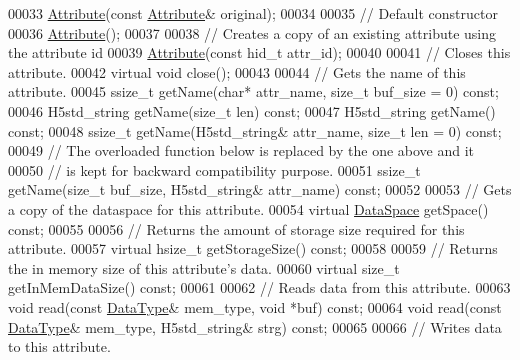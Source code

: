 \begin{DoxyCode}
00033         \hyperlink{class_h5_1_1_attribute}{Attribute}(\textcolor{keyword}{const} \hyperlink{class_h5_1_1_attribute}{Attribute}& original);
00034 
00035         \textcolor{comment}{// Default constructor}
00036         \hyperlink{class_h5_1_1_attribute}{Attribute}();
00037 
00038         \textcolor{comment}{// Creates a copy of an existing attribute using the attribute id}
00039         \hyperlink{class_h5_1_1_attribute}{Attribute}(\textcolor{keyword}{const} hid\_t attr\_id);
00040 
00041         \textcolor{comment}{// Closes this attribute.}
00042         \textcolor{keyword}{virtual} \textcolor{keywordtype}{void} close();
00043 
00044         \textcolor{comment}{// Gets the name of this attribute.}
00045         ssize\_t getName(\textcolor{keywordtype}{char}* attr\_name, \textcolor{keywordtype}{size\_t} buf\_size = 0) \textcolor{keyword}{const};
00046         H5std\_string getName(\textcolor{keywordtype}{size\_t} len) \textcolor{keyword}{const};
00047         H5std\_string getName() \textcolor{keyword}{const};
00048         ssize\_t getName(H5std\_string& attr\_name, \textcolor{keywordtype}{size\_t} len = 0) \textcolor{keyword}{const};
00049         \textcolor{comment}{// The overloaded function below is replaced by the one above and it}
00050         \textcolor{comment}{// is kept for backward compatibility purpose.}
00051         ssize\_t getName(\textcolor{keywordtype}{size\_t} buf\_size, H5std\_string& attr\_name) \textcolor{keyword}{const};
00052 
00053         \textcolor{comment}{// Gets a copy of the dataspace for this attribute.}
00054         \textcolor{keyword}{virtual} \hyperlink{class_h5_1_1_data_space}{DataSpace} getSpace() \textcolor{keyword}{const};
00055 
00056         \textcolor{comment}{// Returns the amount of storage size required for this attribute.}
00057         \textcolor{keyword}{virtual} hsize\_t getStorageSize() \textcolor{keyword}{const};
00058 
00059         \textcolor{comment}{// Returns the in memory size of this attribute's data.}
00060         \textcolor{keyword}{virtual} \textcolor{keywordtype}{size\_t} getInMemDataSize() \textcolor{keyword}{const};
00061 
00062         \textcolor{comment}{// Reads data from this attribute.}
00063         \textcolor{keywordtype}{void} read(\textcolor{keyword}{const} \hyperlink{class_h5_1_1_data_type}{DataType}& mem\_type, \textcolor{keywordtype}{void} *buf) \textcolor{keyword}{const};
00064         \textcolor{keywordtype}{void} read(\textcolor{keyword}{const} \hyperlink{class_h5_1_1_data_type}{DataType}& mem\_type, H5std\_string& strg) \textcolor{keyword}{const};
00065 
00066         \textcolor{comment}{// Writes data to this attribute.}

\end{DoxyCode}
